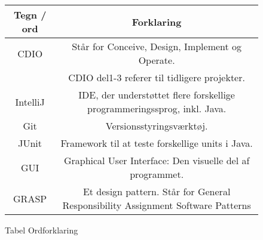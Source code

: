 \begin{flushleft}
\begin{figure}[htp]
    \centering
\begin{tabular}{ | c | c | } 
\hline
Tegn / ord & Forklaring \\ 
\hline
CDIO & Står for Conceive, Design, Implement og Operate. \\
& CDIO del1-3 referer til tidligere projekter.\\
\hline
IntelliJ & IDE, der understøttet flere forskellige programmeringssprog, inkl. Java. \\ 
\hline
Git & Versionsstyringsværktøj. \\ 
\hline
JUnit & Framework til at teste forskellige units i Java. \\ 
\hline
GUI & Graphical User Interface: Den visuelle del af programmet. \\ 
\hline
GRASP & Et design pattern. Står for General Responsibility Assignment Software Patterns \\
\hline
 
\hline
\end{tabular}
\caption{Tabel Ordforklaring}
\end{figure}

\end{flushleft}